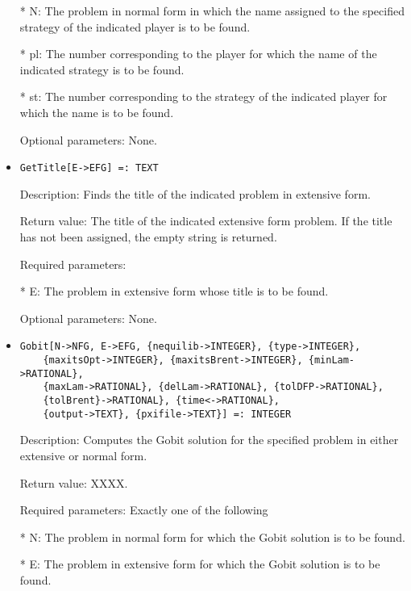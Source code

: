 \begin{itemize}
\bd
\item
[* N:] The problem in normal form in which the name assigned to the
specified strategy of the indicated player is to be found.
\item
[* pl:] The number corresponding to the player for which the name of
the indicated strategy is to be found.
\item
[* st:] The number corresponding to the strategy of the indicated 
player for which the name is to be found.
\ed

\item
[Optional parameters:] None.
\ed

\item
\begin{verbatim}
GetTitle[E->EFG] =: TEXT
\end{verbatim}

\bd
\item
[Description:] Finds the title of the indicated problem in extensive form.
\item
[Return value:] The title of the indicated extensive form problem.  If
the title has not been assigned, the empty string is returned.
\item
[Required parameters:]\hfil\null

\bd
\item
[* E:] The problem in extensive form whose title is to be found.
\ed

\item
[Optional parameters:] None.
\ed

\item
\begin{verbatim}
Gobit[N->NFG, E->EFG, {nequilib->INTEGER}, {type->INTEGER},
	{maxitsOpt->INTEGER}, {maxitsBrent->INTEGER}, {minLam->RATIONAL},
	{maxLam->RATIONAL}, {delLam->RATIONAL}, {tolDFP->RATIONAL},
	{tolBrent}->RATIONAL}, {time<->RATIONAL}, 
	{output->TEXT}, {pxifile->TEXT}] =: INTEGER
\end{verbatim}

\bd
\item
[Description:] Computes the Gobit solution for the specified problem in
either extensive or normal form.  
\item
[Return value:] XXXX.
\item 
[Required parameters:]\hfil\null Exactly one of the following

\bd
\item
[* N:] The problem in normal form for which the Gobit solution is to
be found.
\item	
[* E:] The problem in extensive form for which the Gobit solution 
is to be found.
\ed


\end{itemize}
